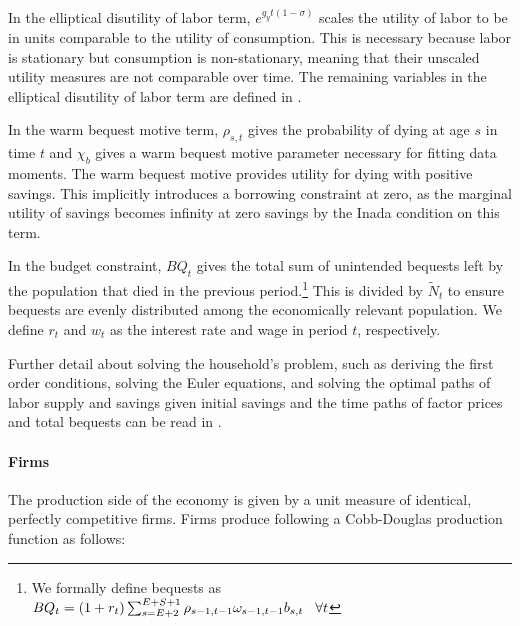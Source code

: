 \documentclass[10pt]{article}
\numberwithin{equation}{subsection}
\begin{document}
\begin{appendices}
\par In the elliptical disutility of labor term, \(e^{g_yt(1-\sigma)}\) scales the utility of labor to be in units comparable to the utility of consumption. This is necessary because labor is stationary but consumption is non-stationary, meaning that their unscaled utility measures are not comparable over time. The remaining variables in the elliptical disutility of labor term are defined in \cite{DE2018}.

\par In the warm bequest motive term, \(\rho_{s,t}\) gives the probability of dying at age \(s\) in time \(t\) and \(\chi_b\) gives a warm bequest motive parameter necessary for fitting data moments. The warm bequest motive provides utility for dying with positive savings. This implicitly introduces a borrowing constraint at zero, as the marginal utility of savings becomes infinity at zero savings by the Inada condition on this term.

\par In the budget constraint, \(BQ_t\) gives the total sum of unintended bequests left by the population that died in the previous period.\footnote{We formally define bequests as \(BQ_t = (1+r_t)\sum_{s=E+2}^{E+S+1}\rho_{s-1,t-1}\omega_{s-1,t-1}b_{s,t} \hspace{3mm} \forall t\)} This is divided by \(\tilde{N}_t\) to ensure bequests are evenly distributed among the economically relevant population. We define \(r_t\) and \(w_t\) as the interest rate and wage in period \(t\), respectively.

\par Further detail about solving the household's problem, such as deriving the first order conditions, solving the Euler equations, and solving the optimal paths of labor supply and savings given initial savings and the time paths of factor prices and total bequests can be read in \cite{E2020}.


\paragraph{Firms}

The production side of the economy is given by a unit measure of identical, perfectly competitive firms. Firms produce following a Cobb-Douglas production function as follows:


\end{appendices}
\end{document}
